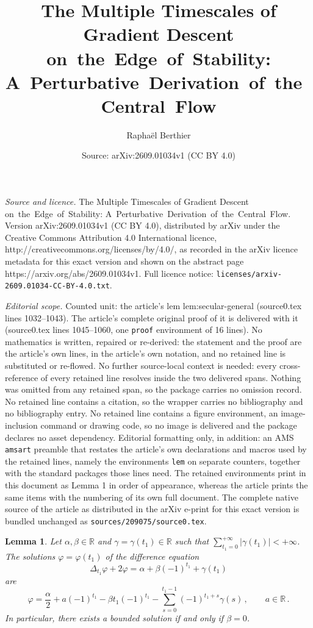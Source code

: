 \documentclass[10pt,a4paper]{amsart}
\title{The Multiple Timescales of Gradient Descent on~the~Edge~of~Stability: A~Perturbative~Derivation~of~the~Central~Flow}
\author{Rapha\"el Berthier}
\date{Source: arXiv:2609.01034v1 (CC BY 4.0)}
\newtheorem{lem}{Lemma}
\newcommand{\R}{\mathbb{R}}
\begin{document}
\maketitle

\noindent\emph{Source and licence.} The Multiple Timescales of Gradient Descent on~the~Edge~of~Stability: A~Perturbative~Derivation~of~the~Central~Flow. Version arXiv:2609.01034v1 (CC BY 4.0), distributed by arXiv under the Creative Commons Attribution 4.0 International licence, http://creativecommons.org/licenses/by/4.0/, as recorded in the arXiv licence metadata for this exact version and shown on the abstract page https://arxiv.org/abs/2609.01034v1. Full licence notice: \texttt{licenses/arxiv-2609.01034-CC-BY-4.0.txt}.\par\smallskip

\noindent\textit{Editorial scope.} Counted unit: the article's lem lem:secular-general (source0.tex lines 1032--1043). The article's complete original proof of it is delivered with it (source0.tex lines 1045--1060, one \texttt{proof} environment of 16 lines). No mathematics is written, repaired or re-derived: the statement and the proof are the article's own lines, in the article's own notation, and no retained line is substituted or re-flowed.  No further source-local context is needed: every cross-reference of every retained line resolves inside the two delivered spans.  Nothing was omitted from any retained span, so the package carries no omission record.  No retained line contains a citation, so the wrapper carries no bibliography and no bibliography entry.  No retained line contains a figure environment, an image-inclusion command or drawing code, so no image is delivered and the package declares no asset dependency.  Editorial formatting only, in addition: an AMS \texttt{amsart} preamble that restates the article's own declarations and macros used by the retained lines, namely the environments \texttt{lem} on separate counters, together with the standard packages those lines need.  The retained environments print in this document as Lemma 1 in order of appearance, whereas the article prints the same items with the numbering of its own full document.  The complete native source of the article as distributed in the arXiv e-print for this exact version is bundled unchanged as \texttt{sources/209075/source0.tex}.
    \begin{lem}
        \label{lem:secular-general}
        Let $\alpha, \beta \in \R$ and $\gamma = \gamma(t_1) \in \R$ such that $\sum_{t_1=0}^{+\infty} |\gamma(t_1)| < +\infty$. The solutions $\varphi = \varphi(t_1)$ of the difference equation
        \begin{equation*}
            \Delta_{t_1} \varphi + 2 \varphi = \alpha + \beta (-1)^{t_1} + \gamma(t_1)
        \end{equation*}
        are 
        \begin{equation*}
            \varphi = \frac{\alpha}{2} + a (-1)^{t_1} - \beta t_1 (-1)^{t_1} - \sum_{s=0}^{t_1-1} (-1)^{t_1+s} \gamma(s) \, , \qquad a \in \R \, .
        \end{equation*} 
        In particular, there exists a bounded solution if and only if $\beta = 0$.
    \end{lem}
\end{document}
